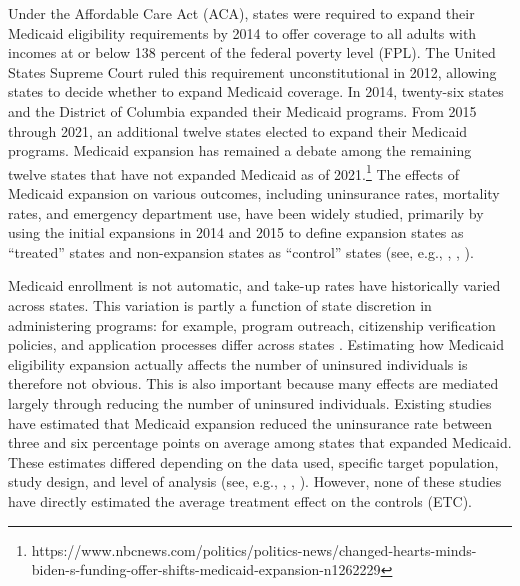 \documentclass[aoas]{imsart}
\theoremstyle{plain}
\theoremstyle{remark}
\begin{document}
Under the Affordable Care Act (ACA), states were required to expand their Medicaid eligibility requirements by 2014 to offer coverage to all adults with incomes at or below 138 percent of the federal poverty level (FPL). The United States Supreme Court ruled this requirement unconstitutional in 2012, allowing states to decide whether to expand Medicaid coverage. In 2014, twenty-six states and the District of Columbia expanded their Medicaid programs. From 2015 through 2021, an additional twelve states elected to expand their Medicaid programs. Medicaid expansion has remained a debate among the remaining twelve states that have not expanded Medicaid as of 2021.\footnote{https://www.nbcnews.com/politics/politics-news/changed-hearts-minds-biden-s-funding-offer-shifts-medicaid-expansion-n1262229} The effects of Medicaid expansion on various outcomes, including uninsurance rates, mortality rates, and emergency department use, have been widely studied, primarily by using the initial expansions in 2014 and 2015 to define expansion states as ``treated'' states and non-expansion states as ``control'' states (see, e.g., \citet{courtemanche2017early}, \citet{miller2021medicaid}, \citet{ladhania2021effect}).

Medicaid enrollment is not automatic, and take-up rates have historically varied across states. This variation is partly a function of state discretion in administering programs: for example, program outreach, citizenship verification policies, and application processes differ across states \citep{courtemanche2017early}. Estimating how Medicaid eligibility expansion actually affects the number of uninsured individuals is therefore not obvious. This is also important because many effects are mediated largely through reducing the number of uninsured individuals. Existing studies have estimated that Medicaid expansion reduced the uninsurance rate between three and six percentage points on average among states that expanded Medicaid. These estimates differed depending on the data used, specific target population, study design, and level of analysis (see, e.g., \citet{kaestner2017effects}, \citet{courtemanche2017early}, \citet{frean2017premium}). However, none of these studies have directly estimated the average treatment effect on the controls (ETC). 
\end{document}
